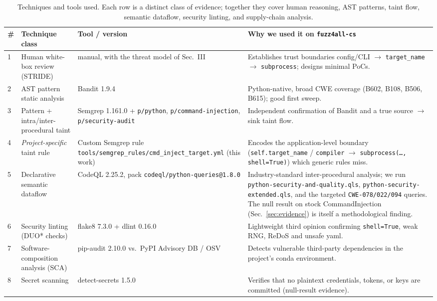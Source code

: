 \documentclass[conference]{IEEEtran}
\begin{document}
\begin{table}[t]
\caption{Techniques and tools used. Each row is a distinct class of
evidence; together they cover human reasoning, AST patterns, taint
flow, semantic dataflow, security linting, and supply-chain analysis.}
\label{tab:tools}
\centering\renewcommand{\arraystretch}{1.2}
\begin{tabularx}{\textwidth}{lllX}
\toprule
\textbf{\#} & \textbf{Technique class} & \textbf{Tool / version} & \textbf{Why we used it on \texttt{fuzz4all-cs}} \\
\midrule
1 & Human white-box review (STRIDE) & manual, with the threat model of Sec.~III & Establishes trust boundaries config/CLI $\rightarrow$ \texttt{target\_name} $\rightarrow$ \texttt{subprocess}; designs minimal PoCs. \\
2 & AST pattern static analysis & Bandit 1.9.4 & Python-native, broad CWE coverage (B602, B108, B506, B615); good first sweep. \\
3 & Pattern + intra/inter-procedural taint & Semgrep 1.161.0 + \texttt{p/python}, \texttt{p/command-injection}, \texttt{p/security-audit} & Independent confirmation of Bandit and a true source $\rightarrow$ sink taint flow. \\
4 & \emph{Project-specific} taint rule & Custom Semgrep rule \texttt{tools/semgrep\_rules/cmd\_inject\_target.yml} (this work) & Encodes the application-level boundary (\texttt{self.target\_name} / \texttt{compiler} $\rightarrow$ \texttt{subprocess(\ldots, shell=True)}) which generic rules miss. \\
5 & Declarative semantic dataflow & CodeQL 2.25.2, pack \texttt{codeql/python-queries@1.8.0} & Industry-standard inter-procedural analysis; we run \texttt{python-security-and-quality.qls}, \texttt{python-security-extended.qls}, and the targeted \texttt{CWE-078/022/094} queries. The null result on stock CommandInjection (Sec.~\ref{sec:evidence}) is itself a methodological finding. \\
6 & Security linting (DUO* checks) & flake8 7.3.0 + dlint 0.16.0 & Lightweight third opinion confirming \texttt{shell=True}, weak RNG, ReDoS and unsafe yaml. \\
7 & Software-composition analysis (SCA) & pip-audit 2.10.0 vs.\ PyPI Advisory DB / OSV & Detects vulnerable third-party dependencies in the project's conda environment. \\
8 & Secret scanning & detect-secrets 1.5.0 & Verifies that no plaintext credentials, tokens, or keys are committed (null-result evidence). \\
\bottomrule
\end{tabularx}
\end{table}
\end{document}
